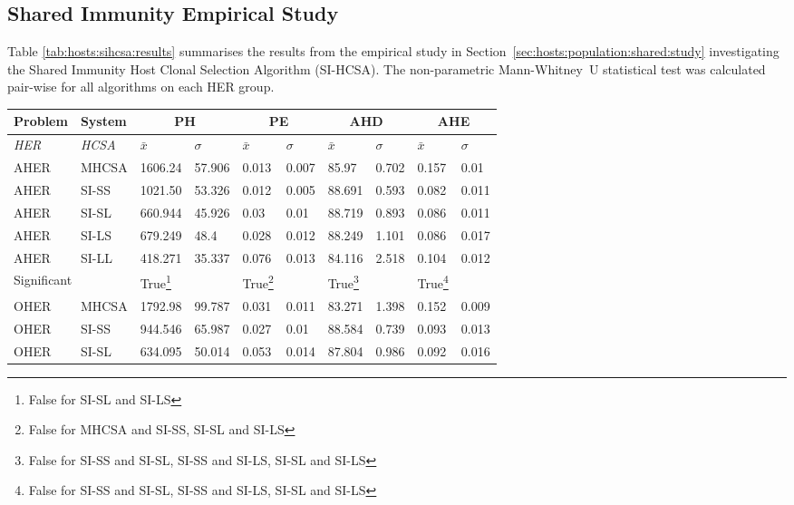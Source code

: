 %
%
\subsection{Shared Immunity Empirical Study}
\label{appendix:results:hosts:shared}
Table \ref{tab:hosts:sihcsa:results} summarises the results from the empirical study in Section~\ref{sec:hosts:population:shared:study} investigating the Shared Immunity Host Clonal Selection Algorithm (SI-HCSA). The non-parametric Mann-Whitney~U statistical test was calculated pair-wise for all algorithms on each HER group.

\begin{table}[H]
	\centering\small
		\begin{minipage}{\textwidth}
		\begin{tabular}{llllllllll}
		\toprule
		\textbf{Problem} & \textbf{System} & \multicolumn{2}{c}{\textbf{PH}} & \multicolumn{2}{c}{\textbf{PE}} & \multicolumn{2}{c}{\textbf{AHD}} &\multicolumn{2}{c}{\textbf{AHE}} \\ 
		\midrule
		\emph{HER} & \emph{HCSA} & $\bar{x}$ & $\sigma$ & $\bar{x}$ & $\sigma$ & $\bar{x}$ & $\sigma$ & $\bar{x}$ & $\sigma$ \\ 
		\toprule
		AHER & MHCSA & 1606.24 & 57.906 & 0.013 & 0.007 & 85.97 & 0.702 & 0.157 & 0.01 \\ 
		AHER & SI-SS & 1021.50 & 53.326 & 0.012 & 0.005 & 88.691 & 0.593 & 0.082 & 0.011 \\ 
		AHER & SI-SL & 660.944 & 45.926 & 0.03 & 0.01 & 88.719 & 0.893 & 0.086 & 0.011 \\ 
		AHER & SI-LS & 679.249 & 48.4 & 0.028 & 0.012 & 88.249 & 1.101 & 0.086 & 0.017 \\ 
		AHER & SI-LL & 418.271 & 35.337 & 0.076 & 0.013 & 84.116 & 2.518 & 0.104 & 0.012 \\ 
		\multicolumn{2}{l}{Significant} & True\footnote{False for SI-SL and SI-LS} & & True\footnote{False for MHCSA and SI-SS, SI-SL and SI-LS} &  & True\footnote{False for SI-SS and SI-SL, SI-SS and SI-LS, SI-SL and SI-LS} & & True\footnote{False for SI-SS and SI-SL, SI-SS and SI-LS, SI-SL and SI-LS} & \\ 
		\midrule
		OHER & MHCSA & 1792.98 & 99.787 & 0.031 & 0.011 & 83.271 & 1.398 & 0.152 & 0.009 \\ 
		OHER & SI-SS & 944.546 & 65.987 & 0.027 & 0.01 & 88.584 & 0.739 & 0.093 & 0.013 \\ 
		OHER & SI-SL & 634.095 & 50.014 & 0.053 & 0.014 & 87.804 & 0.986 & 0.092 & 0.016 \\ 

\end{tabular}
\end{minipage}
\end{table}
